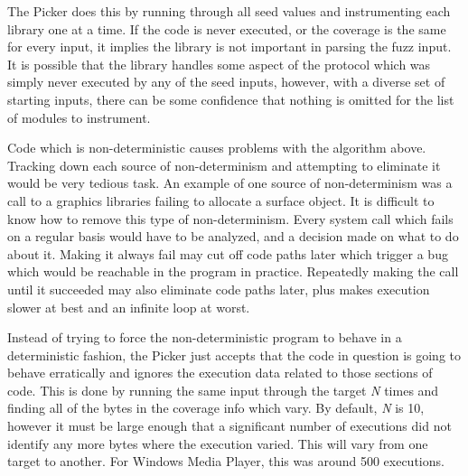 The Picker does this by running through all seed values and instrumenting each
library one at a time. If the code is never executed, or the coverage is the
same for every input, it implies the library is not important in parsing the
fuzz input.  It is possible that the library handles some aspect of the
protocol which was simply never executed by any of the seed inputs, however,
with a diverse set of starting inputs, there can be some confidence that
nothing is omitted for the list of modules to instrument.

Code which is non-deterministic causes problems with the algorithm above.
Tracking down each source of non-determinism and attempting to eliminate it
would be very tedious task. An example of one source of non-determinism was a
call to a graphics libraries failing to allocate a surface object. It is
difficult to know how to remove this type of non-determinism. Every system call
which fails on a regular basis would have to be analyzed, and a decision made
on what to do about it.  Making it always fail may cut off code paths later
which trigger a bug which would be reachable in the program in practice.
Repeatedly making the call until it succeeded may also eliminate code paths
later, plus makes execution slower at best and an infinite loop at worst.

Instead of trying to force the non-deterministic program to behave in a
deterministic fashion, the Picker just accepts that the code in question is
going to behave erratically and ignores the execution data related to those
sections of code.  This is done by running the same input through the target
\textit{N} times and finding all of the bytes in the coverage info which
vary. By default, \textit{N} is 10, however it must be large enough that a
significant number of executions did not identify any more bytes where the
execution varied. This will vary from one target to another.  For Windows
Media Player, this was around 500 executions.  %


